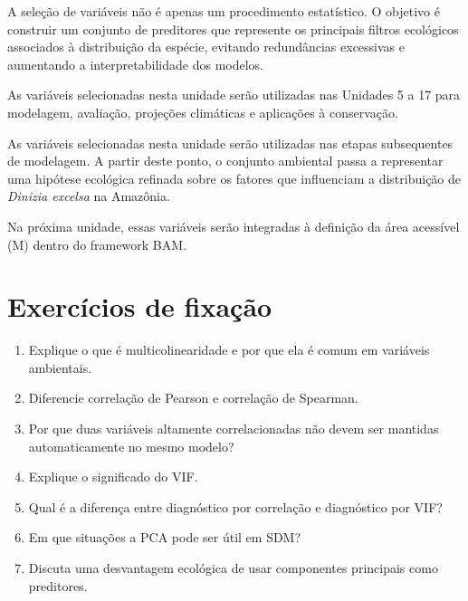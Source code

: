 \begin{conceito}[title={\faBook\quad Mensagem central da Unidade 4}]
	A seleção de variáveis não é apenas um procedimento estatístico.
	O objetivo é construir um conjunto de preditores que represente
	os principais filtros ecológicos associados à distribuição da espécie,
	evitando redundâncias excessivas e aumentando a interpretabilidade
	dos modelos.
	
	As variáveis selecionadas nesta unidade serão utilizadas
	nas Unidades 5 a 17 para modelagem, avaliação,
	projeções climáticas e aplicações à conservação.
\end{conceito}

\begin{aplicacao}
	As variáveis selecionadas nesta unidade serão utilizadas nas etapas subsequentes de modelagem. A partir deste ponto, o conjunto ambiental passa a representar uma hipótese ecológica refinada sobre os fatores que influenciam a distribuição de \textit{Dinizia excelsa} na Amazônia.
	
	Na próxima unidade, essas variáveis serão integradas à definição da área acessível (M) dentro do framework BAM.
\end{aplicacao}

\section{Exercícios de fixação}

\begin{enumerate}
	\item Explique o que é multicolinearidade e por que ela é comum em variáveis ambientais.
	\item Diferencie correlação de Pearson e correlação de Spearman.
	\item Por que duas variáveis altamente correlacionadas não devem ser mantidas automaticamente no mesmo modelo?
	\item Explique o significado do VIF.
	\item Qual é a diferença entre diagnóstico por correlação e diagnóstico por VIF?
	\item Em que situações a PCA pode ser útil em SDM?
	\item Discuta uma desvantagem ecológica de usar componentes principais como preditores.
\end{enumerate}

